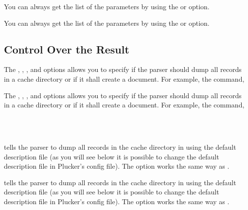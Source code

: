 \begin{latexonly}
You can always get the list of the parameters by using the 
or  option.
\end{latexonly}
\begin{htmlonly}
You can always get the list of the parameters by using the 
or  option.
\end{htmlonly}

\subsection{Control Over the Result}\label{sec:ParserOutput}

\begin{latexonly}
The , , 
, and 
options allows you to specify if the parser should dump all records in
a cache directory or if it shall create a document. For example, the command,
\end{latexonly}
\begin{htmlonly}
The , , 
, and 
options allows you to specify if the parser should dump all records in
a cache directory or if it shall create a document. For example, the command,
\end{htmlonly}\\

\\

\begin{latexonly}
tells the parser to dump all records in the cache directory in 
using the default description file (as you will see below it is possible
to change the default description file in Plucker's config file). The 
 option works the same way as .
\end{latexonly}
\begin{htmlonly}
tells the parser to dump all records in the cache directory in 
using the default description file (as you will see below it is possible
to change the default description file in Plucker's config file). The 
 option works the same way as .
\end{htmlonly}\\

